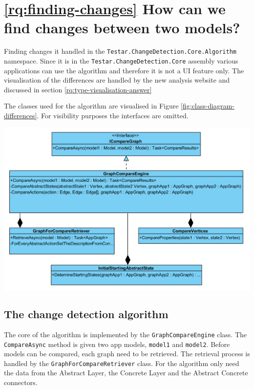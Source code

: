 \section{\ref{rq:finding-changes} How can we find changes between two models?}

Finding changes it handled in the \verb|Testar.ChangeDetection.Core.Algorithm| namespace. Since it is in the \verb|Testar.ChangeDetection.Core| assembly various applications can use the algorithm and therefore it is not a UI feature only. The visualisation of the differences are handled by the new analysis website and discussed in section \ref{rq:type-visualisation-answer}

The classes used for the algorithm are visualised in Figure \ref{fig:class-diagram-differences}. For visibility purposes the interfaces are omitted.

\begingroup
\captionsetup{type=figure}
\includegraphics[scale=0.5]{thesis/images/4-UML-Differences.png}
\label{fig:class-diagram-differences}
\endgroup

\subsection{The change detection algorithm}

The core of the algorithm is implemented by the \verb|GraphCompareEngine| class. The \verb|CompareAsync| method is given two app models, \verb|model1| and \verb|model2|. Before models can be compared, each graph need to be retrieved. The retrieval process is handled by the \verb|GraphForCompareRetriever| class. For the algorithm only need the data from the Abstract Layer, the Concrete Layer and the Abstract Concrete connectors.



